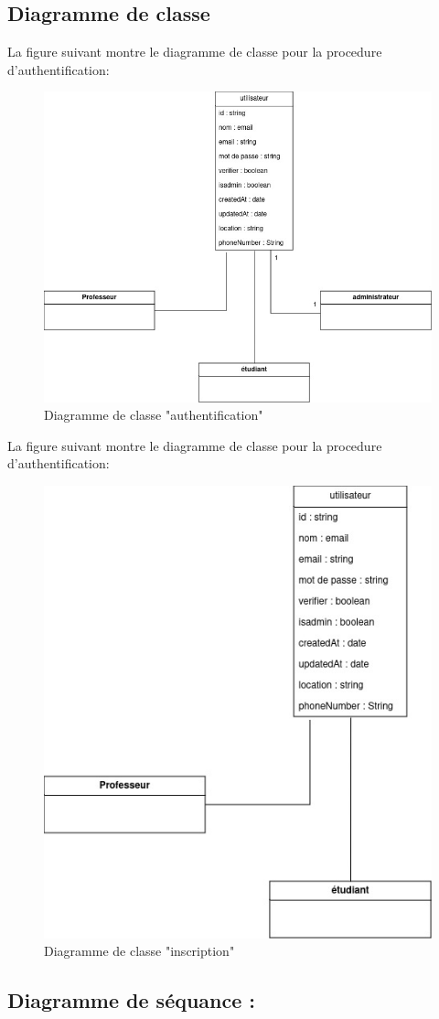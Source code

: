 \subsection{Diagramme de classe  }
La figure suivant montre le diagramme de classe pour la procedure d'authentification: 
\begin{figure}[h]
    \centering
    \includegraphics[width=0.65\linewidth]{pages/image/asma-class_diagramme-authentifier.jpg}
    \caption{Diagramme de classe "authentification"}
    \label{fig:enter-label}
\end{figure}

La figure suivant montre le diagramme de classe pour la procedure d'authentification: 

\begin{figure}[h!]
    \center
    \includegraphics[width=0.5\linewidth]{pages/image/asma-classdiagramme-inscrire.jpg}
    \caption{Diagramme de classe "inscription"}
\end{figure}







\subsection{Diagramme de séquance :}
